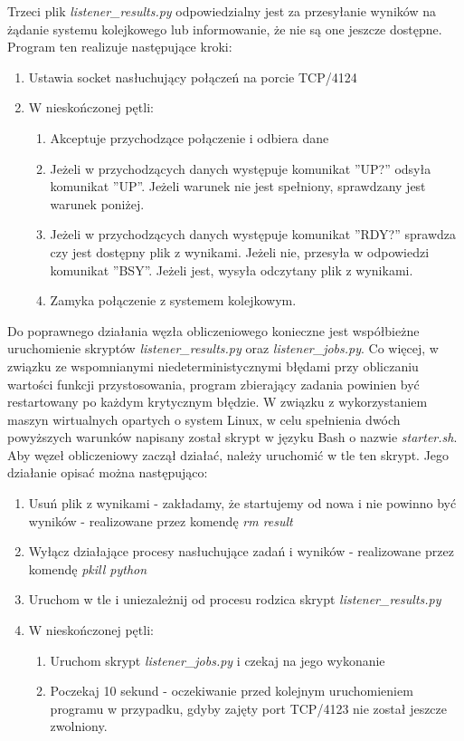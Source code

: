 Trzeci plik \textit{listener\_results.py} odpowiedzialny jest za przesyłanie wyników na żądanie systemu kolejkowego lub informowanie, że nie są one jeszcze dostępne.
Program ten realizuje następujące kroki:
\begin{enumerate}
  \item Ustawia socket nasłuchujący połączeń na porcie TCP/4124
  \item W nieskończonej pętli:
  \begin{enumerate}
    \item Akceptuje przychodzące połączenie i odbiera dane
    \item Jeżeli w przychodzących danych występuje komunikat ''UP?'' odsyła komunikat ''UP''. Jeżeli warunek nie jest spełniony, sprawdzany jest warunek poniżej.
    \item Jeżeli w przychodzących danych występuje komunikat ''RDY?'' sprawdza czy jest dostępny plik z wynikami. Jeżeli nie, przesyła w odpowiedzi komunikat ''BSY''. Jeżeli jest, wysyła odczytany plik z wynikami.
    \item Zamyka połączenie z systemem kolejkowym.
  \end{enumerate}
\end{enumerate}

Do poprawnego działania węzła obliczeniowego konieczne jest współbieżne uruchomienie skryptów \textit{listener\_results.py} oraz \textit{listener\_jobs.py}.
Co więcej, w związku ze wspomnianymi niedeterministycznymi błędami przy obliczaniu wartości funkcji przystosowania, program zbierający zadania powinien być restartowany po każdym krytycznym błędzie.
W związku z wykorzystaniem maszyn wirtualnych opartych o system Linux, w celu spełnienia dwóch powyższych warunków napisany został skrypt w języku Bash o nazwie \textit{starter.sh}.
Aby węzeł obliczeniowy zaczął działać, należy uruchomić w tle ten skrypt.
Jego działanie opisać można następująco:
\begin{enumerate}
  \item Usuń plik z wynikami - zakładamy, że startujemy od nowa i nie powinno być wyników - realizowane przez komendę \textit{rm result}
  \item Wyłącz działające procesy nasłuchujące zadań i wyników - realizowane przez komendę \textit{pkill python}
  \item Uruchom w tle i uniezależnij od procesu rodzica skrypt \textit{listener\_results.py}
  \item W nieskończonej pętli:
  \begin{enumerate}
    \item Uruchom skrypt \textit{listener\_jobs.py} i czekaj na jego wykonanie
    \item Poczekaj 10 sekund - oczekiwanie przed kolejnym uruchomieniem programu w przypadku, gdyby zajęty port TCP/4123 nie został jeszcze zwolniony.
  \end{enumerate}
\end{enumerate}

